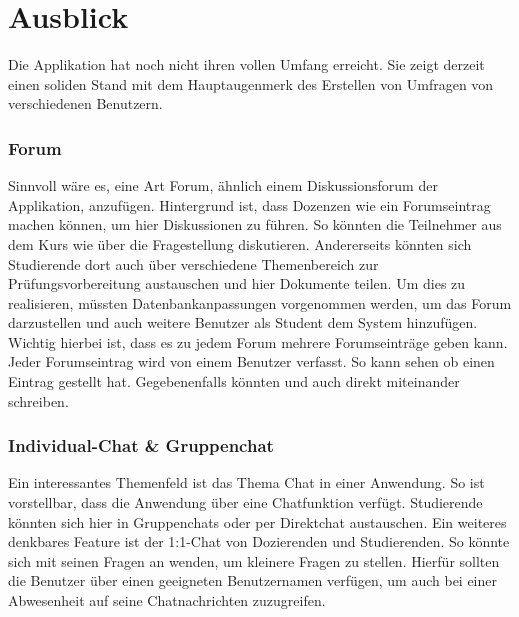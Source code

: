 \section{Ausblick}
\label{sec:Ausblick}

Die Applikation hat noch nicht ihren vollen Umfang erreicht.
Sie zeigt derzeit einen soliden Stand mit dem Hauptaugenmerk des Erstellen von Umfragen von verschiedenen Benutzern.

\subsubsection*{Forum}
Sinnvoll wäre es, eine Art Forum, ähnlich einem Diskussionsforum der Applikation, anzufügen.
Hintergrund ist, dass \zb Dozenzen wie \dutzi ein Forumseintrag machen können, um hier Diskussionen zu führen.
So könnten die Teilnehmer aus dem Kurs wie \weigert über die Fragestellung diskutieren.
Andererseits könnten sich Studierende dort auch über verschiedene Themenbereich zur Prüfungsvorbereitung austauschen und hier Dokumente teilen. \newline
Um dies zu realisieren, müssten Datenbankanpassungen vorgenommen werden, um das Forum darzustellen und auch weitere Benutzer als Student dem System hinzufügen.
Wichtig hierbei ist, dass es zu jedem Forum mehrere Forumseinträge geben kann.
Jeder Forumseintrag wird von einem Benutzer verfasst. \newline
So kann \dutzi sehen ob \weigert einen Eintrag gestellt hat.
Gegebenenfalls könnten \dutzi und \weigert auch direkt miteinander schreiben.

\subsubsection*{Individual-Chat \& Gruppenchat}
Ein interessantes Themenfeld ist das Thema Chat in einer Anwendung.
So ist vorstellbar, dass die Anwendung über eine Chatfunktion verfügt.
Studierende könnten sich hier in Gruppenchats oder per Direktchat austauschen.
Ein weiteres denkbares Feature ist der 1:1-Chat von Dozierenden und Studierenden.
So könnte sich \weigert mit seinen Fragen an \dutzi wenden, um kleinere Fragen zu stellen. \newline
Hierfür sollten die Benutzer über einen geeigneten Benutzernamen verfügen, um auch bei einer Abwesenheit auf seine Chatnachrichten zuzugreifen.
